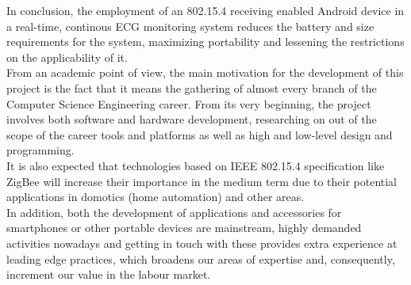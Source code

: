 		In conclusion, the employment of an 802.15.4 receiving enabled Android device in a real-time, continous ECG monitoring system reduces the battery and size requirements for the system, maximizing portability and lessening the restrictions on the applicability of it.\\

		From an academic point of view, the main motivation for the development of this project is the fact that it means
		the gathering of almost every branch of the Computer Science Engineering career. From its very beginning, the
		project involves both software and hardware development, researching on out of the scope of the career 
		tools and platforms as well as high and low-level design and programming.\\

		It is also
		expected that technologies based on IEEE 802.15.4 specification like ZigBee will increase their
		importance in the medium term due to their potential applications in domotics (home automation) and other areas.\\

		In addition, both the development of applications and accessories for smartphones or other portable devices
		are mainstream, highly demanded activities nowadays and getting in touch with these
		provides extra experience at leading edge practices, which broadens our areas of
		expertise and, consequently, increment our value in the labour market.\\

		
